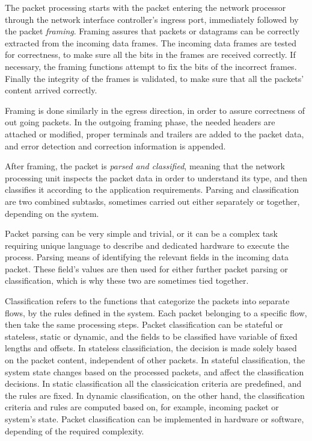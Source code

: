 The packet processing starts with the packet entering the network processor through the network interface controller's ingress port, immediately followed by the packet \emph{framing}. Framing assures that packets or datagrams can be correctly extracted from the incoming data frames. The incoming data frames are tested for correctness, to make sure all the bits in the frames are received correctly. If necessary, the framing functions attempt to fix the bits of the incorrect frames. Finally the integrity of the frames is validated, to make sure that all the packets' content arrived correctly.~\cite{Giladi:2008:Network}

Framing is done similarly in the egress direction, in order to assure correctness of out going packets. In the outgoing framing phase, the needed headers are attached or modified, proper terminals and trailers are added to the packet data, and error detection and correction information is appended.~\cite{Giladi:2008:Network}

After framing, the packet is \emph{parsed and classified}, meaning that the network processing unit inspects the packet data in order to understand its type, and then classifies it according to the application requirements. Parsing and classification are two combined subtasks, sometimes carried out either separately or together, depending on the system.~\cite{Giladi:2008:Network}

Packet parsing can be very simple and trivial, or it can be a complex task requiring unique language to describe and dedicated hardware to execute the process. Parsing means of identifying the relevant fields in the incoming data packet. These field's values are then used for either further packet parsing or classification, which is why these two are sometimes tied together.~\cite{Giladi:2008:Network}

Classification refers to the functions that categorize the packets into separate flows, by the rules defined in the system. Each packet belonging to a specific flow, then take the same processing steps. Packet classification can be stateful or stateless, static or dynamic, and the fields to be classified have variable of fixed lengths and offsets. In stateless classificiation, the decision is made solely based on the packet content, independent of other packets. In stateful classification, the system state changes based on the processed packets, and affect the classification decisions. In static classification all the classicication criteria are predefined, and the rules are fixed. In dynamic classification, on the other hand, the classification criteria and rules are computed based on, for example, incoming packet or system's state. Packet classification can be implemented in hardware or software, depending of the required complexity.~\cite{Giladi:2008:Network}

